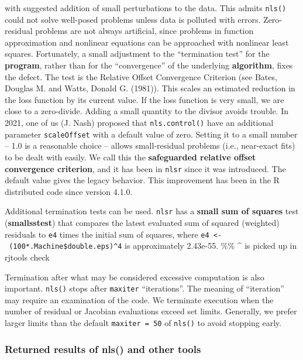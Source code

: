 with suggested addition of small perturbations to the data. This admits
\texttt{nls()} could not solve well-posed problems unless data is polluted
with errors. Zero-residual problems are not always artificial,
since problems in function approximation and nonlinear equations can be
approached with nonlinear least squares. Fortunately, a small adjustment
to the ``termination test'' for the \textbf{program}, rather than for the
``convergence'' of the underlying \textbf{algorithm}, fixes the defect. The test
is the Relative Offset Convergence
Criterion (see Bates, Douglas M. and Watts, Donald G. (1981)). This scales an estimated reduction in the loss
function by its current value. If the loss function is very small, we are close
to a zero-divide. Adding a small quantity to the divisor avoids trouble.
In 2021, one of us (J. Nash) proposed that \texttt{nls.control()} have an
additional parameter \texttt{scaleOffset} with a default value of zero. Setting it to a
small number -- 1.0 is a reasonable choice -- allows small-residual problems
(i.e., near-exact fits) to be dealt with easily. We call this the
\textbf{safeguarded relative offset convergence criterion}, and it has been in \texttt{nlsr}
since it was introduced. The default value
gives the legacy behavior. This improvement has been in the R distributed code
since version 4.1.0.

Additional termination tests can be used. \texttt{nlsr} has a \textbf{small sum of
squares} test (\textbf{smallsstest}) that compares the latest evaluated sum of squared
(weighted) residuals to \texttt{e4} times the initial sum of squares, where
\texttt{e4\ \textless{}-\ (100*.Machine\$double.eps)\^{}4} is approximately 2.43e-55.
\%\% \^{} is picked up in rjtools check

Termination after what may be considered excessive computation is also important.
\texttt{nls()} stops after \texttt{maxiter} ``iterations''. The meaning of ``iteration'' may require an
examination of the code. We terminate execution when the number of residual or
Jacobian evaluations exceed set limits. Generally, we prefer larger limits than the
default \texttt{maxiter\ =\ 50} of \texttt{nls()} to avoid stopping early.

\hypertarget{returned-results-of-nls-and-other-tools}{%
\subsubsection{Returned results of nls() and other tools}\label{returned-results-of-nls-and-other-tools}}

